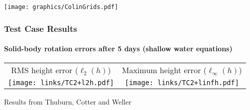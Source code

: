 \begin{frame}
\texttt{[image: graphics/ColinGrids.pdf]}
\end{frame}

 
\makeatletter{}\begin{frame}
\frametitle{Test Case Results}
\framesubtitle{Solid-body rotation errors after 5 days (shallow water equations)}

\begin{tabular}{cc}
RMS height error ($\ell_2(h)$)
&
Maximum height error ($\ell_\infty(h)$)
\\
\texttt{[image: links/TC2+l2h.pdf]}
&
\texttt{[image: links/TC2+linfh.pdf]}
\end{tabular}

Results from Thuburn, Cotter and Weller

\end{frame}

